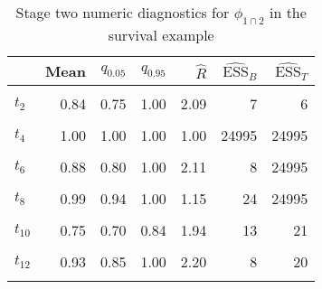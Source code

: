 \begin{table}

\caption{\label{tab:surv-stage-two-diag-phi-12}Stage two numeric diagnostics for $\phi_{1 \cap 2}$ in the survival example}
\centering
\begin{tabular}[t]{lrrrrrr}
\toprule
  & Mean & $q_{0.05}$ & $q_{0.95}$ & $\widehat{R}$ & $\widehat{\text{ESS}}_{B}$ & $\widehat{\text{ESS}}_{T}$\\
\midrule
\cellcolor{gray!6}{$t_{1}$} & \cellcolor{gray!6}{1.00} & \cellcolor{gray!6}{1.00} & \cellcolor{gray!6}{1.00} & \cellcolor{gray!6}{1.00} & \cellcolor{gray!6}{24995} & \cellcolor{gray!6}{24995}\\
$t_{2}$ & 0.84 & 0.75 & 1.00 & 2.09 & 7 & 6\\
\cellcolor{gray!6}{$t_{3}$} & \cellcolor{gray!6}{0.89} & \cellcolor{gray!6}{0.83} & \cellcolor{gray!6}{1.00} & \cellcolor{gray!6}{1.63} & \cellcolor{gray!6}{20} & \cellcolor{gray!6}{24995}\\
$t_{4}$ & 1.00 & 1.00 & 1.00 & 1.00 & 24995 & 24995\\
\cellcolor{gray!6}{$t_{5}$} & \cellcolor{gray!6}{1.00} & \cellcolor{gray!6}{1.00} & \cellcolor{gray!6}{1.00} & \cellcolor{gray!6}{1.00} & \cellcolor{gray!6}{24995} & \cellcolor{gray!6}{24995}\\
$t_{6}$ & 0.88 & 0.80 & 1.00 & 2.11 & 8 & 24995\\
\cellcolor{gray!6}{$t_{7}$} & \cellcolor{gray!6}{0.82} & \cellcolor{gray!6}{0.74} & \cellcolor{gray!6}{1.00} & \cellcolor{gray!6}{2.30} & \cellcolor{gray!6}{7} & \cellcolor{gray!6}{24995}\\
$t_{8}$ & 0.99 & 0.94 & 1.00 & 1.15 & 24 & 24995\\
\cellcolor{gray!6}{$t_{9}$} & \cellcolor{gray!6}{0.62} & \cellcolor{gray!6}{0.55} & \cellcolor{gray!6}{0.75} & \cellcolor{gray!6}{2.91} & \cellcolor{gray!6}{10} & \cellcolor{gray!6}{25}\\
$t_{10}$ & 0.75 & 0.70 & 0.84 & 1.94 & 13 & 21\\
\cellcolor{gray!6}{$t_{11}$} & \cellcolor{gray!6}{0.93} & \cellcolor{gray!6}{0.82} & \cellcolor{gray!6}{1.00} & \cellcolor{gray!6}{2.77} & \cellcolor{gray!6}{11} & \cellcolor{gray!6}{24995}\\
$t_{12}$ & 0.93 & 0.85 & 1.00 & 2.20 & 8 & 20\\
\cellcolor{gray!6}{$t_{13}$} & \cellcolor{gray!6}{0.88} & \cellcolor{gray!6}{0.73} & \cellcolor{gray!6}{1.00} & \cellcolor{gray!6}{3.33} & \cellcolor{gray!6}{6} & \cellcolor{gray!6}{24995}\\

\end{tabular}
\end{table}
